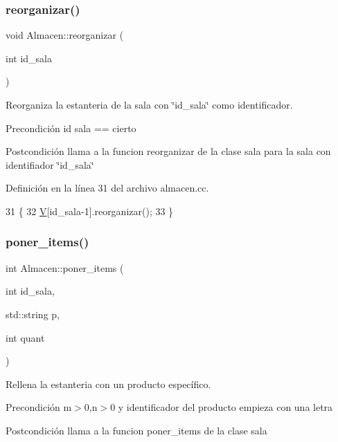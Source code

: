 \subsubsection{\texorpdfstring{reorganizar()}{reorganizar()}}
{\footnotesize\ttfamily void Almacen\+::reorganizar (\begin{DoxyParamCaption}\item[{int}]{id\+\_\+sala }\end{DoxyParamCaption})}



Reorganiza la estanteria de la sala con \char`\"{}id\+\_\+sala\char`\"{} como identificador. 

\begin{DoxyPrecond}{Precondición}
id sala == cierto 
\end{DoxyPrecond}
\begin{DoxyPostcond}{Postcondición}
llama a la funcion reorganizar de la clase sala para la sala con identifiador \char`\"{}id\+\_\+sala\char`\"{} 
\end{DoxyPostcond}


Definición en la línea 31 del archivo almacen.\+cc.


\begin{DoxyCode}
31                                      \{
32   \mbox{\hyperlink{class_almacen_a76cad3a8f2f670e26d7ceb827f7f9e69}{V}}[id\_sala-1].reorganizar();
33 \}
\end{DoxyCode}
\mbox{\label{class_almacen_ad2829b7fb8be4ced00511472636982bf}} 
\subsubsection{\texorpdfstring{poner\+\_\+items()}{poner\_items()}}
{\footnotesize\ttfamily int Almacen\+::poner\+\_\+items (\begin{DoxyParamCaption}\item[{int}]{id\+\_\+sala,  }\item[{std\+::string}]{p,  }\item[{int}]{quant }\end{DoxyParamCaption})}



Rellena la estanteria con un producto específico. 

\begin{DoxyPrecond}{Precondición}
m$>$0,n$>$0 y identificador del producto empieza con una letra 
\end{DoxyPrecond}
\begin{DoxyPostcond}{Postcondición}
llama a la funcion poner\+\_\+items de la clase sala 
\end{DoxyPostcond}


